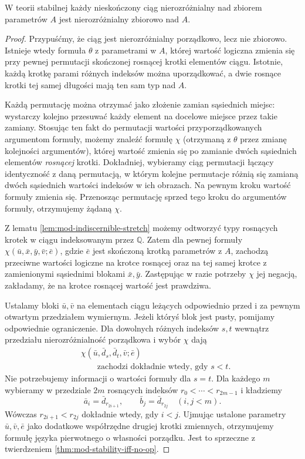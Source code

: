\begin{twierdzenie}
\label{thm:mod-stable-indiscernible-set}
W teorii stabilnej każdy nieskończony ciąg
nierozróżnialny nad zbiorem parametrów $A$
jest nierozróżnialny zbiorowo nad $A$.
\end{twierdzenie}
\begin{proof}
Przypuśćmy, że ciąg jest nierozróżnialny
porządkowo, lecz nie zbiorowo. Istnieje wtedy
formuła $\theta$ z parametrami w $A$,
której wartość logiczna zmienia się przy
pewnej permutacji skończonej rosnącej krotki
elementów ciągu. Istotnie, każdą krotkę
parami różnych indeksów można uporządkować,
a dwie rosnące krotki tej samej długości
mają ten sam typ nad $A$.

Każdą permutację można otrzymać jako złożenie
zamian sąsiednich miejsc: wystarczy kolejno
przesuwać każdy element na docelowe miejsce
przez takie zamiany. Stosując ten fakt do
permutacji wartości przyporządkowanych
argumentom formuły, możemy znaleźć formułę
$\chi$ (otrzymaną z $\theta$ przez zmianę
kolejności argumentów), której wartość
zmienia się po zamianie dwóch sąsiednich
elementów \emph{rosnącej} krotki.
Dokładniej, wybieramy ciąg permutacji
łączący identyczność z daną permutacją,
w którym kolejne permutacje różnią się
zamianą dwóch sąsiednich wartości indeksów
w ich obrazach. Na pewnym kroku wartość
formuły zmienia się. Przenosząc permutację
sprzed tego kroku do argumentów formuły,
otrzymujemy żądaną $\chi$.

Z lematu \ref{lem:mod-indiscernible-stretch}
możemy odtworzyć typy rosnących krotek
w ciągu indeksowanym przez $\mathbb Q$.
Zatem dla pewnej formuły
$\chi(\bar u,\bar x,\bar y,\bar v;\bar e)$,
gdzie $\bar e$ jest skończoną krotką
parametrów z $A$, zachodzą przeciwne
wartości logiczne na krotce rosnącej
oraz na tej samej krotce z zamienionymi
sąsiednimi blokami $\bar x,\bar y$.
Zastępując w razie potrzeby $\chi$ jej
negacją, zakładamy, że na krotce rosnącej
wartość jest prawdziwa.

Ustalamy bloki $\bar u,\bar v$ na elementach
ciągu leżących odpowiednio przed i za
pewnym otwartym przedziałem wymiernym.
Jeżeli któryś blok jest pusty, pomijamy
odpowiednie ograniczenie.
Dla dowolnych różnych indeksów $s,t$
wewnątrz przedziału nierozróżnialność
porządkowa i wybór $\chi$ dają
\[
\begin{aligned}
&\chi(\bar u,\bar d_s,\bar d_t,\bar v;\bar e)
\\
&\qquad\text{zachodzi dokładnie wtedy, gdy }s<t.
\end{aligned}
\]
Nie potrzebujemy informacji o wartości formuły
dla $s=t$. Dla każdego $m$ wybieramy w przedziale
$2m$ rosnących indeksów
$r_0<\cdots<r_{2m-1}$ i kładziemy
\[
\bar a_i=\bar d_{r_{2i+1}},\qquad
\bar b_j=\bar d_{r_{2j}}\quad (i,j<m).
\]
Wówczas $r_{2i+1}<r_{2j}$ dokładnie wtedy,
gdy $i<j$. Ujmując ustalone parametry
$\bar u,\bar v,\bar e$ jako dodatkowe
współrzędne drugiej krotki zmiennych,
otrzymujemy formułę języka pierwotnego
o własności porządku. Jest to sprzeczne
z twierdzeniem \ref{thm:mod-stability-iff-no-op}.
\end{proof}

